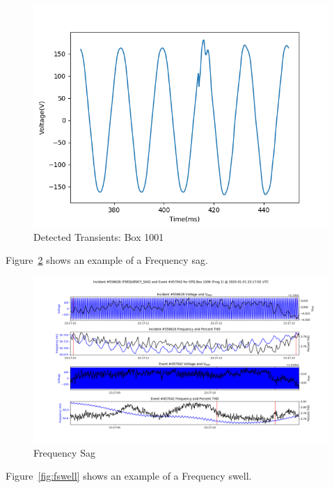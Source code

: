 \begin{figure}[H]
    \centering
    \includegraphics[width=\linewidth]{figures/transient.png}
    \caption{Detected Transients: Box 1001}
    \label{fig:transients}
\end{figure}

Figure~\ref{fig:fsag} shows an example of a Frequency sag.

\begin{figure}[H]
    \centering
    \includegraphics[width=\linewidth]{figures/incident-556626.png}
    \caption{Frequency Sag}
    \label{fig:fsag}
\end{figure}

Figure~\ref{fig:fswell} shows an example of a Frequency swell.

